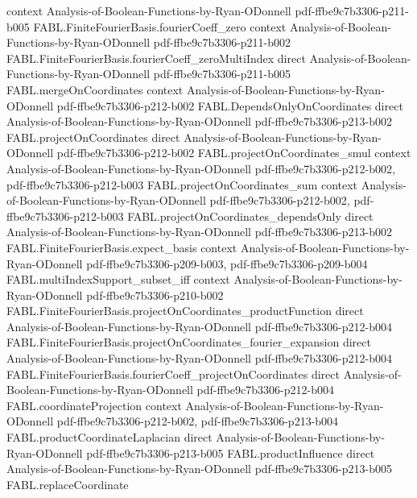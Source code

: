 \begin{theorem}
  {context}
  {Analysis-of-Boolean-Functions-by-Ryan-ODonnell}
  {pdf-ffbe9c7b3306-p211-b005}
\proofstep
  {FABL.FiniteFourierBasis.fourierCoeff_zero}
  {context}
  {Analysis-of-Boolean-Functions-by-Ryan-ODonnell}
  {pdf-ffbe9c7b3306-p211-b002}
\proofstep
  {FABL.FiniteFourierBasis.fourierCoeff_zeroMultiIndex}
  {direct}
  {Analysis-of-Boolean-Functions-by-Ryan-ODonnell}
  {pdf-ffbe9c7b3306-p211-b005}
\proofstep
  {FABL.mergeOnCoordinates}
  {context}
  {Analysis-of-Boolean-Functions-by-Ryan-ODonnell}
  {pdf-ffbe9c7b3306-p212-b002}
\proofstep
  {FABL.DependsOnlyOnCoordinates}
  {direct}
  {Analysis-of-Boolean-Functions-by-Ryan-ODonnell}
  {pdf-ffbe9c7b3306-p213-b002}
\proofstep
  {FABL.projectOnCoordinates}
  {direct}
  {Analysis-of-Boolean-Functions-by-Ryan-ODonnell}
  {pdf-ffbe9c7b3306-p212-b002}
\proofstep
  {FABL.projectOnCoordinates_smul}
  {context}
  {Analysis-of-Boolean-Functions-by-Ryan-ODonnell}
  {pdf-ffbe9c7b3306-p212-b002,
    pdf-ffbe9c7b3306-p212-b003}
\proofstep
  {FABL.projectOnCoordinates_sum}
  {context}
  {Analysis-of-Boolean-Functions-by-Ryan-ODonnell}
  {pdf-ffbe9c7b3306-p212-b002,
    pdf-ffbe9c7b3306-p212-b003}
\proofstep
  {FABL.projectOnCoordinates_dependsOnly}
  {direct}
  {Analysis-of-Boolean-Functions-by-Ryan-ODonnell}
  {pdf-ffbe9c7b3306-p213-b002}
\proofstep
  {FABL.FiniteFourierBasis.expect_basis}
  {context}
  {Analysis-of-Boolean-Functions-by-Ryan-ODonnell}
  {pdf-ffbe9c7b3306-p209-b003,
    pdf-ffbe9c7b3306-p209-b004}
\proofstep
  {FABL.multiIndexSupport_subset_iff}
  {context}
  {Analysis-of-Boolean-Functions-by-Ryan-ODonnell}
  {pdf-ffbe9c7b3306-p210-b002}
\proofstep
  {FABL.FiniteFourierBasis.projectOnCoordinates_productFunction}
  {direct}
  {Analysis-of-Boolean-Functions-by-Ryan-ODonnell}
  {pdf-ffbe9c7b3306-p212-b004}
\proofstep
  {FABL.FiniteFourierBasis.projectOnCoordinates_fourier_expansion}
  {direct}
  {Analysis-of-Boolean-Functions-by-Ryan-ODonnell}
  {pdf-ffbe9c7b3306-p212-b004}
\proofstep
  {FABL.FiniteFourierBasis.fourierCoeff_projectOnCoordinates}
  {direct}
  {Analysis-of-Boolean-Functions-by-Ryan-ODonnell}
  {pdf-ffbe9c7b3306-p212-b004}
\proofstep
  {FABL.coordinateProjection}
  {context}
  {Analysis-of-Boolean-Functions-by-Ryan-ODonnell}
  {pdf-ffbe9c7b3306-p212-b002,
    pdf-ffbe9c7b3306-p213-b004}
\proofstep
  {FABL.productCoordinateLaplacian}
  {direct}
  {Analysis-of-Boolean-Functions-by-Ryan-ODonnell}
  {pdf-ffbe9c7b3306-p213-b005}
\proofstep
  {FABL.productInfluence}
  {direct}
  {Analysis-of-Boolean-Functions-by-Ryan-ODonnell}
  {pdf-ffbe9c7b3306-p213-b005}
\proofstep
  {FABL.replaceCoordinate}

\end{theorem}
